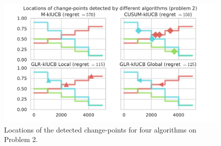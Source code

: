 

\begin{figure}[h!]  %
    \centering
    \includegraphics[width=0.90\linewidth]{2-Chapters/6-Chapter/Images/Visualizing_locations_of_change_points_for_different_algorithms__4algs_Pb2.pdf}
    \caption{Locations of the detected change-points for four algorithms on Problem 2.}
    \label{fig:6:Visualizing_locations_of_change_points_for_different_algorithms__4algs_Pb2}
\end{figure}

